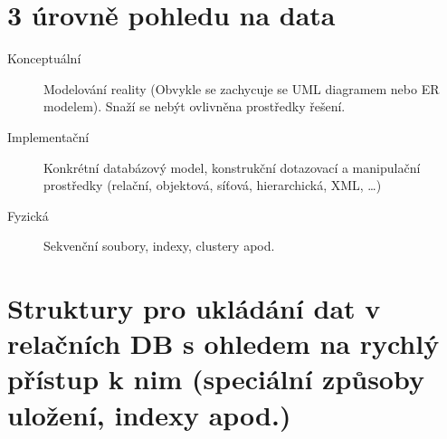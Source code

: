 \documentclass{szzclass}
\begin{document}
\section{3 úrovně pohledu na data}

\begin{description}
  \item[Konceptuální] Modelování reality (Obvykle se zachycuje se UML diagramem nebo ER modelem). Snaží se nebýt ovlivněna prostředky řešení.
  \item[Implementační] Konkrétní databázový model, konstrukční dotazovací a manipulační prostředky (relační, objektová, síťová, hierarchická, XML, \dots)
  \item[Fyzická] Sekvenční soubory, indexy, clustery apod.
\end{description}

\section{Struktury pro ukládání dat v relačních DB s ohledem na rychlý přístup k nim (speciální způsoby uložení, indexy apod.)}
\end{document}
